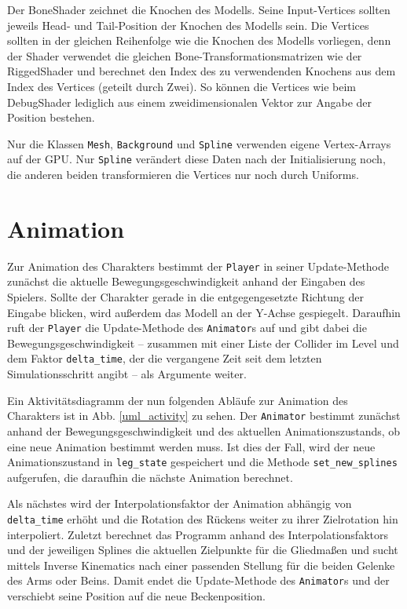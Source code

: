 Der BoneShader zeichnet die Knochen des Modells. Seine Input-Vertices sollten jeweils Head- und Tail-Position der Knochen des Modells sein. Die Vertices sollten in der gleichen Reihenfolge wie die Knochen des Modells vorliegen, denn der Shader verwendet die gleichen Bone-Transformationsmatrizen wie der RiggedShader und berechnet den Index des zu verwendenden Knochens aus dem Index des Vertices (geteilt durch Zwei). So können die Vertices wie beim DebugShader lediglich aus einem zweidimensionalen Vektor zur Angabe der Position bestehen.

Nur die Klassen \lstinline{Mesh}, \lstinline{Background} und \lstinline{Spline} verwenden eigene Vertex-Arrays auf der GPU. Nur \lstinline{Spline} verändert diese Daten nach der Initialisierung noch, die anderen beiden transformieren die Vertices nur noch durch Uniforms.

\section{Animation} \label{animator_section}
Zur Animation des Charakters bestimmt der \lstinline{Player} in seiner Update-Methode zunächst die aktuelle Bewegungsgeschwindigkeit anhand der Eingaben des Spielers. Sollte der Charakter gerade in die entgegengesetzte Richtung der Eingabe blicken, wird außerdem das Modell an der Y-Achse gespiegelt. Daraufhin ruft der \lstinline{Player} die Update-Methode des \lstinline{Animator}s auf und gibt dabei die Bewegungsgeschwindigkeit -- zusammen mit einer Liste der Collider im Level und dem Faktor \lstinline{delta_time}, der die vergangene Zeit seit dem letzten Simulationsschritt angibt -- als Argumente weiter.

Ein Aktivitätsdiagramm der nun folgenden Abläufe zur Animation des Charakters ist in Abb. \ref{uml_activity} zu sehen. Der \lstinline{Animator} bestimmt zunächst anhand der Bewegungsgeschwindigkeit und des aktuellen Animationszustands, ob eine neue Animation bestimmt werden muss. Ist dies der Fall, wird der neue Animationszustand in \lstinline{leg_state} gespeichert und die Methode \lstinline{set_new_splines} aufgerufen, die daraufhin die nächste Animation berechnet.

Als nächstes wird der Interpolationsfaktor der Animation abhängig von \lstinline{delta_time} erhöht und die Rotation des Rückens weiter zu ihrer Zielrotation hin interpoliert. Zuletzt berechnet das Programm anhand des Interpolationsfaktors und der jeweiligen Splines die aktuellen Zielpunkte für die Gliedmaßen und sucht mittels Inverse Kinematics nach einer passenden Stellung für die beiden Gelenke des Arms oder Beins. Damit endet die Update-Methode des \lstinline{Animator}s und der  verschiebt seine Position auf die neue Beckenposition.

